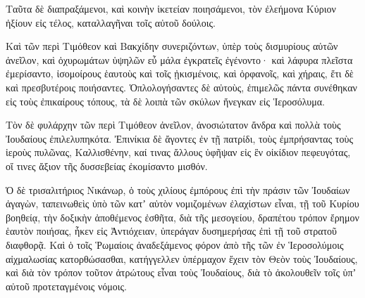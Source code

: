 {Ταῦτα δὲ διαπραξάμενοι, καὶ κοινὴν ἱκετείαν ποιησάμενοι, τὸν ἐλεήμονα Κύριον ἠξίουν εἰς τέλος, καταλλαγῆναι τοῖς αὐτοῦ δούλοις.
\par }{\PP {}Καὶ τῶν περὶ Τιμόθεον καὶ Βακχίδην συνεριζόντων, ὑπὲρ τοὺς δισμυρίους αὐτῶν ἀνεῖλον, καὶ ὀχυρωμάτων ὑψηλῶν εὖ μάλα ἐγκρατεῖς ἐγένοντο· καὶ λάφυρα πλεῖστα ἐμερίσαντο, ἰσομοίρους ἑαυτοὺς καὶ τοῖς ᾐκισμένοις, καὶ ὀρφανοῖς, καὶ χήραις, ἔτι δὲ καὶ πρεσβυτέροις ποιήσαντες.
Ὁπλολογήσαντες δὲ αὐτοὺς, ἐπιμελῶς πάντα συνέθηκαν εἰς τοὺς ἐπικαίρους τόπους, τὰ δὲ λοιπὰ τῶν σκύλων ἤνεγκαν εἰς Ἱεροσόλυμα.
\par }{\PP {}Τὸν δὲ φυλάρχην τῶν περὶ Τιμόθεον ἀνεῖλον, ἀνοσιώτατον ἄνδρα καὶ πολλὰ τοὺς Ἰουδαίους ἐπιλελυπηκότα.
Ἐπινίκια δὲ ἄγοντες ἐν τῇ πατρίδι, τοὺς ἐμπρήσαντας τοὺς ἱεροὺς πυλῶνας, Καλλισθένην, καί τινας ἄλλους ὑφῆψαν εἰς ἓν οἰκίδιον πεφευγότας, οἵ τινες ἄξιον τῆς δυσσεβείας ἐκομίσαντο μισθόν.
\par }{\PP {}Ὁ δὲ τρισαλιτήριος Νικάνωρ, ὁ τοὺς χιλίους ἐμπόρους ἐπὶ τὴν πράσιν τῶν Ἰουδαίων ἀγαγὼν,
ταπεινωθεὶς ὑπὸ τῶν κατʼ αὑτὸν νομιζομένων ἐλαχίστων εἶναι, τῇ τοῦ Κυρίου βοηθείᾳ, τὴν δοξικὴν ἀποθέμενος ἐσθῆτα, διὰ τῆς μεσογείου, δραπέτου τρόπον ἔρημον ἑαυτὸν ποιήσας, ἧκεν εἰς Ἀντιόχειαν, ὑπεράγαν δυσημερήσας ἐπὶ τῇ τοῦ στρατοῦ διαφθορᾷ.
Καὶ ὁ τοῖς Ῥωμαίοις ἀναδεξάμενος φόρον ἀπὸ τῆς τῶν ἐν Ἱεροσολύμοις αἰχμαλωσίας κατορθώσασθαι, κατήγγελλεν ὑπέρμαχον ἔχειν τὸν Θεὸν τοὺς Ἰουδαίους, καὶ διὰ τὸν τρόπον τοῦτον ἀτρώτους εἶναι τοὺς Ἰουδαίους, διὰ τὸ ἀκολουθεῖν τοῖς ὑπʼ αὐτοῦ προτεταγμένοις νόμοις.

}
